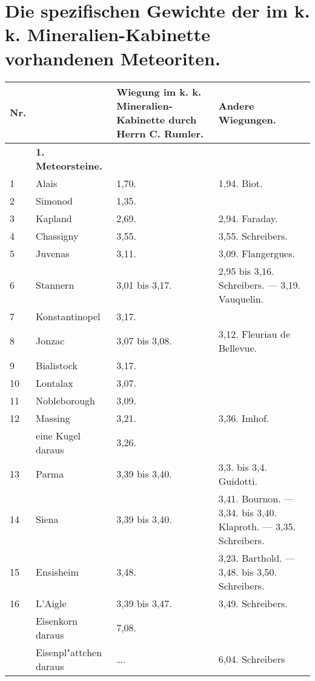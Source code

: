 \documentclass[a4paper, 11pt, oneside, polutonikogreek, german]{article}
\begin{document}
\section{Die spezifischen Gewichte der im k. k. Mineralien-Kabinette vorhandenen Meteoriten.}
\begin{center}
    \begin{longtable}{|p{7mm}|p{32mm}|p{30mm}|p{30mm}|}
    \hline
        Nr. & ~  & Wiegung im k. k. Mineralien-Kabinette durch Herrn C. Rumler. & Andere Wiegungen. \\ \hline
         ~ & \textbf{1. Meteorsteine.} & ~  & ~  \\ \hline
        1 & Alais & 1,70. & 1,94. Biot. \\ \hline
        2 & Simonod & 1,35. &   \\ \hline
        3 & Kapland & 2,69. & 2,94. Faraday. \\ \hline
        4 & Chassigny & 3,55. & 3,55. Schreibers. \\ \hline
        5 & Juvenas & 3,11. & 3,09. Flangergues. \\ \hline
        6 & Stannern & 3,01 bis 3,17. & 2,95 bis 3,16. Schreibers. --- 3,19. Vauquelin. \\ \hline
        7 & Konstantinopel & 3,17. &   \\ \hline
        8 & Jonzac & 3,07 bis 3,08. & 3,12. Fleuriau de Bellevue. \\ \hline
        9 & Bialistock & 3,17. &   \\ \hline
        10 & Lontalax & 3,07. &   \\ \hline
        11 & Nobleborough & 3,09. &   \\ \hline
        12 & Massing & 3,21. & 3,36. Imhof. \\ \hline
          & eine Kugel daraus & 3,26. &   \\ \hline
        13 & Parma & 3,39 bis 3,40. & 3,3. bis 3,4. Guidotti. \\ \hline
        14 & Siena & 3,39 bis 3,40. & 3,41. Bournon. --- 3,34. bis 3,40. Klaproth. --- 3,35. Schreibers. \\ \hline
        15 & Ensisheim & 3,48. & 3,23. Barthold. --- 3,48. bis 3,50. Schreibers. \\ \hline
        16 & L’Aigle & 3,39 bis 3,47. & 3,49. Schreibers. \\ \hline
          & Eisenkorn daraus & 7,08. &   \\ \hline
          & Eisenpl"attchen daraus & …. & 6,04. Schreibers \\ \hline

\end{longtable}
\end{center}
\end{document}
